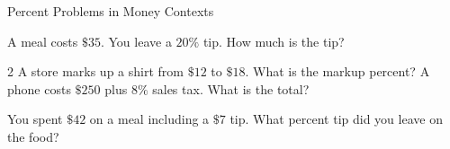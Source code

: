
\newpage
\begin{stepPractice}{Percent Problems in Money Contexts}
    \resetProblems

    \prob A meal costs $\$35$. You leave a $20\%$ tip. How much is the tip? \answerBlank[2cm]

    \begin{multicols}{2}
    \prob A store marks up a shirt from $\$12$ to $\$18$. What is the markup percent? \answerBlank[2cm]
    \prob A phone costs $\$250$ plus $8\%$ sales tax. What is the total? \answerBlank[2cm]
    \end{multicols}

    \prob You spent $\$42$ on a meal including a $\$7$ tip. What percent tip did you leave on the food? \answerBlank[2cm]

\end{stepPractice}
